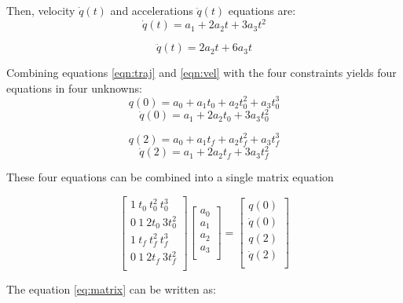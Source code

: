 \documentclass[12pt, a4paper]{report}
\begin{document}
Then, velocity $\dot{q}(t)$ and accelerations $\ddot{q}(t)$ equations are:
\begin{equation}
	\dot{q}(t) = a_1 + 2a_2t + 3a_3t^2	
	\label{eqn:vel}
\end{equation}

\begin{equation}
	\ddot{q}(t) = 2a_2t + 6a_3t	
\end{equation}

Combining equations \ref{eqn:traj} and \ref{eqn:vel} with the four constraints yields four
equations in four unknowns:
\begin{equation}
	q(0) = a_0 + a_1t_0 + a_2t_0^2 + a_3t_0^3
\end{equation}
\begin{equation}
	\dot{q}(0) = a_1 + 2a_2t_0 + 3a_3t_0^2
\end{equation}

\begin{equation}
	q(2) = a_0 + a_1t_f + a_2t_f^2 + a_3t_f^3
\end{equation}
\begin{equation}
	\dot{q}(2) = a_1 + 2a_2t_f + 3a_3t_f^2
\end{equation}

These four equations can be combined into a single matrix equation

\begin{equation}
	\begin{bmatrix}
	1 \ t_0 \ t_0^2 \ t_0^3 \\
	0 \ 1 \ 2t_0 \ 3t_0^2 \\
	1 \ t_f \ t_f^2 \ t_f^3 \\
	0 \ 1 \ 2t_f \ 3t_f^2 \\
	\end{bmatrix}
	\begin{bmatrix}
	a_0 \\ a_1 \\ a_2 \\ a_3 \\
	\end{bmatrix} = 
	\begin{bmatrix}
	q(0) \\ \dot{q}(0) \\ q(2) \\ \dot{q}(2) \\
	\end{bmatrix}
	\label{eq:matrix}
\end{equation}

The equation \ref{eq:matrix} can be written as:
\end{document}
